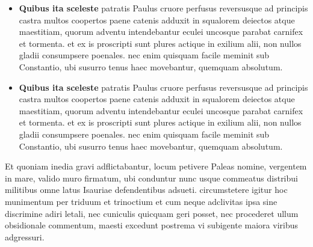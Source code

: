 \begin{itemize}
  
  \item \textbf{Quibus ita sceleste} patratis Paulus cruore perfusus reversusque ad principis
castra multos coopertos paene catenis adduxit in squalorem deiectos atque
maestitiam, quorum adventu intendebantur eculei uncosque parabat carnifex et
tormenta. et ex is proscripti sunt plures actique in exilium alii, non nullos
gladii consumpsere poenales. nec enim quisquam facile meminit sub Constantio,
ubi susurro tenus haec movebantur, quemquam absolutum.
 
  \item \textbf{Quibus ita sceleste} patratis Paulus cruore perfusus reversusque ad principis
castra multos coopertos paene catenis adduxit in squalorem deiectos atque
maestitiam, quorum adventu intendebantur eculei uncosque parabat carnifex et
tormenta. et ex is proscripti sunt plures actique in exilium alii, non nullos
gladii consumpsere poenales. nec enim quisquam facile meminit sub Constantio,
ubi susurro tenus haec movebantur, quemquam absolutum.

\end{itemize}

Et quoniam inedia gravi adflictabantur, locum petivere Paleas nomine, vergentem
in mare, valido muro firmatum, ubi conduntur nunc usque commeatus distribui
militibus omne latus Isauriae defendentibus adsueti. circumstetere igitur hoc
munimentum per triduum et trinoctium et cum neque adclivitas ipsa sine
discrimine adiri letali, nec cuniculis quicquam geri posset, nec procederet
ullum obsidionale commentum, maesti excedunt postrema vi subigente maiora
viribus adgressuri.


